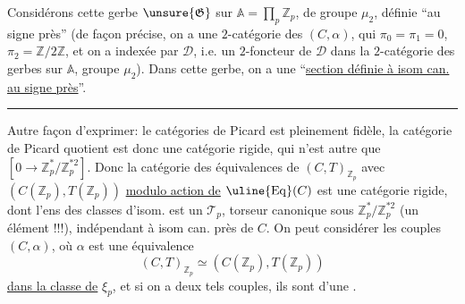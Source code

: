 
Considérons cette gerbe $\unsure{\mathfrak G}$ sur $\mathbb A=\prod_p\mathbb Z_p$, de groupe $\mu_2$, définie ``au signe près'' (de façon précise, on a une $2$-catégorie des $(C,\alpha)$, qui  $\pi_0=\pi_1=0$, $\pi_2=\mathbb Z/2\mathbb Z$, et  on a   indexée par $\mathcal D$, i.e. un $2$-foncteur de $\mathcal D$ dans la $2$-catégorie des gerbes sur $\mathbb A$, groupe $\mu_2$).
Dans cette gerbe, on a une ``\uline{section définie à isom can. au signe près}''.


\medskip
\hrule
\medskip

Autre façon d'exprimer: le   catégories de Picard 
est pleinement fidèle, la catégorie de Picard quotient est donc une catégorie rigide, qui n'est autre que
$[0\longrightarrow\mathbb Z_p^*/\mathbb Z_p^{*2}]$.
Donc la catégorie des équivalences de $(C,T)_{\mathbb Z_p}$ avec $(C(\mathbb Z_p),T(\mathbb Z_p))$
\uline{modulo action de} $\uline{\mathrm{Eq}}(C)$ est une catégorie rigide,
 dont l'ens des classes d'isom. est un $\mathcal T_p$, torseur canonique sous $\mathbb Z_p^*/\mathbb Z_p^{*2}$ (un élément !!!), indépendant à isom can. près de $C$.
On peut considérer les couples $(C,\alpha)$, où $\alpha$ est une équivalence
\[
(C,T)_{\mathbb Z_p}\simeq(C(\mathbb Z_p),T(\mathbb Z_p))
\]
\uline{dans la classe de} $\xi_p$, et
si on a deux tels couples, ils sont \uline{} d'une .
